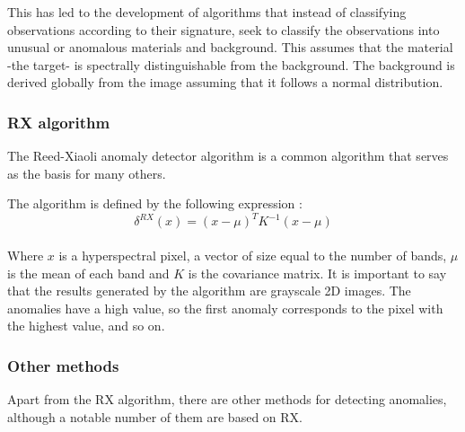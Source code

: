 This has led to the development of algorithms that instead of classifying observations according to their signature, seek to classify the observations into unusual or anomalous materials and background. This assumes that the material -the target- is spectrally distinguishable from the background. The background is derived globally from the image assuming that it follows a normal distribution.


\subsubsection{RX algorithm}
The Reed-Xiaoli anomaly detector algorithm is a common algorithm that serves as the basis for many others.%

The algorithm is defined by the following expression \cite{molero_fast_2011}:
\\
\[\delta ^{RX}(x) = (x-\mu)^{T}K^{-1}(x-\mu)\]

\paragraph{}
\label{mayor}
Where $x$ is a hyperspectral pixel, a vector of size equal to the number of bands, $\mu$ is the mean of each band and $K$ is the covariance matrix. It is important to say that the results generated by the algorithm are grayscale 2D images. The anomalies have a high value, so the first anomaly corresponds to the pixel with the highest value, and so on.

\subsubsection{Other methods}
Apart from the RX algorithm, there are other methods for detecting anomalies, although a notable number of them are based on RX.


